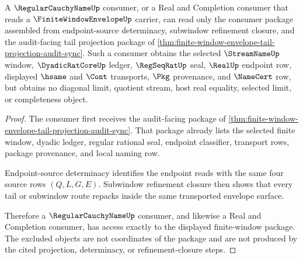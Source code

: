 \begin{theorem}
\label{thm:finite-window-envelope-regularcauchyname-consumer-export}
A $\RegularCauchyNameUp$ consumer, or a Real and Completion consumer that reads a $\FiniteWindowEnvelopeUp$ carrier, can read only the consumer package assembled from endpoint-source determinacy, subwindow refinement closure, and the audit-facing tail projection package of \autoref{thm:finite-window-envelope-tail-projection-audit-sync}. Such a consumer obtains the selected $\StreamNameUp$ window, $\DyadicRatCoreUp$ ledger, $\RegSeqRatUp$ seal, $\RealUp$ endpoint row, displayed $\hsame$ and $\Cont$ transports, $\Pkg$ provenance, and $\NameCert$ row, but obtains no diagonal limit, quotient stream, host real equality, selected limit, or completeness object.
\end{theorem}
\begin{proof}
The consumer first receives the audit-facing package of \autoref{thm:finite-window-envelope-tail-projection-audit-sync}. That package already lists the selected finite window, dyadic ledger, regular rational seal, endpoint classifier, transport rows, package provenance, and local naming row.

Endpoint-source determinacy identifies the endpoint reads with the same four source rows $(Q,L,G,E)$. Subwindow refinement closure then shows that every tail or subwindow route repacks inside the same transported envelope surface.

Therefore a $\RegularCauchyNameUp$ consumer, and likewise a Real and Completion consumer, has access exactly to the displayed finite-window package. The excluded objects are not coordinates of the package and are not produced by the cited projection, determinacy, or refinement-closure steps.
\end{proof}

